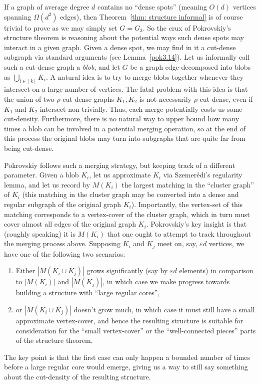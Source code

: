 \documentclass[10pt]{article}
\theoremstyle{definition}
\newcommand\eps{\varepsilon}
\begin{document}
If a graph of average degree $d$ contains no ``dense spots'' (meaning $O(d)$ vertices spanning $\Omega(d^2)$ edges), then Theorem~\ref{thm: structure informal} is of course trivial to prove as we may simply set $G=G_3$. So the crux of Pokrovskiy's structure theorem is reasoning about the potential ways such dense spots may interact in a given graph. Given a dense spot, we may find in it a cut-dense subgraph via standard arguments (see Lemma~\ref{pok3.14}). Let us informally call such a cut-dense graph a \textit{blob}, and let $G$ be a graph edge-decomposed into blobs as $\bigcup_{i\in [k]} K_i$. A natural idea is to try to merge blobs together whenever they intersect on a large number of vertices. The fatal problem with this idea is that the union of two $\rho$-cut-dense graphs $K_1,K_2$ is not necessarily $\rho$-cut-dense, even if $K_1$ and $K_2$ intersect non-trivially. Thus, each merge potentially costs us some cut-density. Furthermore, there is no natural way to upper bound how many times a blob can be involved in a potential merging operation, so at the end of this process the original blobs may turn into subgraphs that are quite far from being cut-dense.
\par Pokrovskiy follows such a merging strategy, but keeping track of a different parameter. Given a blob $K_i$, let us approximate $K_i$ via Szemer\'edi's regularity lemma, and let us record by $M(K_i)$ the largest matching in the ``cluster graph'' of $K_i$ (this matching in the cluster graph may be converted into a dense and regular subgraph of the original graph $K_i$). Importantly, the vertex-set of this matching corresponds to a vertex-cover of the cluster graph, which in turn must cover almost all edges of the original graph $K_i$. Pokrovskiy's key insight is that (roughly speaking) it is $M(K_i)$ that one ought to attempt to track throughout the merging process above. Supposing $K_i$ and $K_j$ meet on, say, $\eps d$ vertices, we have one of the following two scenarios:
\begin{enumerate}
    \item Either $|M(K_i\cup K_j)|$ grows significantly (say by $\eps d$ elements) in comparison to $|M(K_i)|$ and $|M(K_j)|$, in which case we make progress towards building a structure with ``large regular cores'',
    \item or $|M(K_i\cup K_j)|$ doesn't grow much, in which case it must still have a small approximate vertex-cover, and hence the resulting structure is suitable for consideration for the ``small vertex-cover'' or the ``well-connected pieces'' parts of the structure theorem.
\end{enumerate}
The key point is that the first case can only happen a bounded number of times before a large regular core would emerge, giving us a way to still say something about the cut-density of the resulting structure. 
\end{document}
